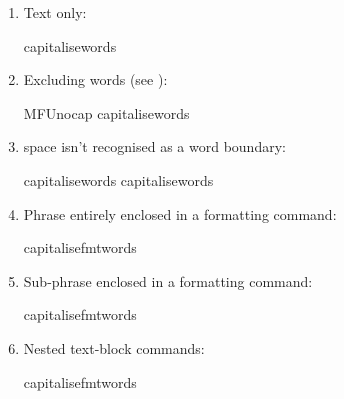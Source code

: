 \documentclass[titlepage=false,oneside,
 fontsize=12pt,captions=tableheading]{scrbook}
\begin{document}
\begin{enumerate}
\item Text only:
\begin{coderesult}
\gls{capitalisewords}
\tcblower
{}
\end{coderesult}

\item Excluding words (see ):
\begin{coderesult}
\gls{MFUnocap}
\gls{capitalisewords}
\tcblower
{}
\end{coderesult}

\item \gls{space} isn't recognised as a word boundary:
\begin{codebox}
\gls{capitalisewords}
\codepar
\gls{capitalisewords}
\end{codebox}
\begin{resultbox}

\end{resultbox}

\item Phrase entirely enclosed in a formatting command:
\begin{codebox}
\gls{capitalisefmtwords}
\end{codebox}
\begin{resultbox}
\end{resultbox}

\item Sub-phrase enclosed in a formatting command:
\begin{codebox}
\gls{capitalisefmtwords}
\end{codebox}
\begin{resultbox}
\end{resultbox}

\item Nested text-block commands:
\begin{codebox}
\gls{capitalisefmtwords}
\end{codebox}
\begin{resultbox}
\end{resultbox}


\end{enumerate}
\end{document}
